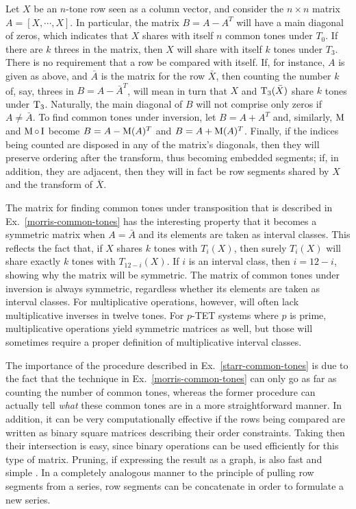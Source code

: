 \begin{example}
	\cite[49]{Morris1987}
    \label{morris-common-tones}
    Let $X$ be an $n$-tone row seen as a column vector, and consider the $n \times n$ matrix $A = [X, \cdots, X]$. In particular, the matrix $B = A - A^T$ will have a main diagonal of zeros, which indicates that $X$ shares with itself $n$ common tones under $T_0$. If there are $k$ threes in the matrix, then $X$ will share with itself $k$ tones under $T_3$. There is no requirement that a row be compared with itself. If, for instance, $A$ is given as above, and $\bar{A}$ is the matrix for the row $\bar{X}$, then counting the number $k$ of, say, threes in $B = A - \bar{A}^T$, will mean in turn that $X$ and $\operatorname{T}_3(\bar{X})$ share $k$ tones under $\operatorname{T}_3$. Naturally, the main diagonal of $B$ will not comprise only zeros if $A \ne \bar{A}$. To find common tones under inversion, let $B = A + A^T$ and, similarly, $\operatorname{M}$ and $\operatorname{M} \circ \operatorname{I}$ become $B = A - \operatorname{M}(A)^T$ and $B = A + \operatorname{M}(A)^T$. Finally, if the indices being counted are disposed in any of the matrix's diagonals, then they will preserve ordering after the transform, thus becoming embedded segments; if, in addition, they are adjacent, then they will in fact be row segments shared by $X$ and the transform of $\bar{X}$.
\end{example}

The matrix for finding common tones under transposition that is described in Ex.~\ref{morris-common-tones} has the interesting property that it becomes a symmetric matrix when $A = \bar{A}$ and its elements are taken as interval classes. This reflects the fact that, if $X$ shares $k$ tones with $T_i(X)$, then surely $T_i(X)$ will share exactly $k$ tones with $T_{12 - i}(X)$. If $i$ is an interval class, then $i = 12 - i$, showing why the matrix will be symmetric. The matrix of common tones under inversion is always symmetric, regardless whether its elements are taken as interval classes. For multiplicative operations, however, will often lack multiplicative inverses in twelve tones. For $p$-TET systems where $p$ is prime, multiplicative operations yield symmetric matrices as well, but those will sometimes require a proper definition of multiplicative interval classes.

The importance of the procedure described in Ex.~\ref{starr-common-tones} is due to the fact that the technique in Ex.~\ref{morris-common-tones} can only go as far as counting the number of common tones, whereas the former procedure can actually tell \emph{what} these common tones are in a more straightforward manner. In addition, it can be very computationally effective if the rows being compared are written as binary square matrices describing their order constraints. Taking then their intersection is easy, since binary operations can be used efficiently for this type of matrix. Pruning, if expressing the result as a graph, is also fast and simple \cite[200]{Starr1984}. In a completely analogous manner to the principle of pulling row segments from a series, row segments can be concatenate in order to formulate a new series. 

